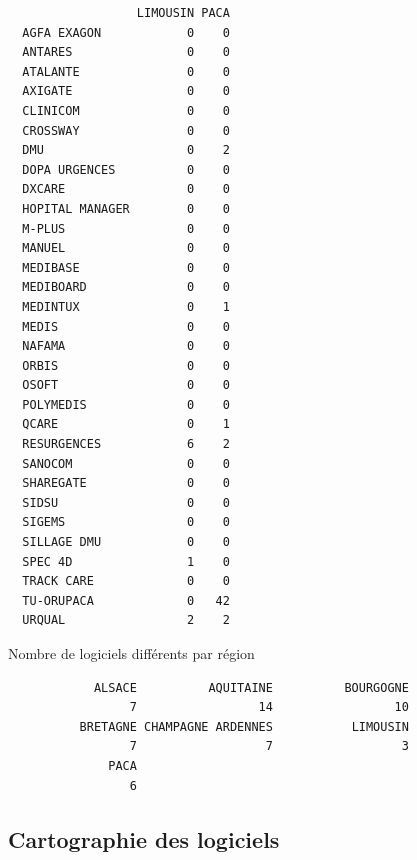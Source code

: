 \documentclass[]{article}
\begin{document}
\begin{verbatim}
                  LIMOUSIN PACA
  AGFA EXAGON            0    0
  ANTARES                0    0
  ATALANTE               0    0
  AXIGATE                0    0
  CLINICOM               0    0
  CROSSWAY               0    0
  DMU                    0    2
  DOPA URGENCES          0    0
  DXCARE                 0    0
  HOPITAL MANAGER        0    0
  M-PLUS                 0    0
  MANUEL                 0    0
  MEDIBASE               0    0
  MEDIBOARD              0    0
  MEDINTUX               0    1
  MEDIS                  0    0
  NAFAMA                 0    0
  ORBIS                  0    0
  OSOFT                  0    0
  POLYMEDIS              0    0
  QCARE                  0    1
  RESURGENCES            6    2
  SANOCOM                0    0
  SHAREGATE              0    0
  SIDSU                  0    0
  SIGEMS                 0    0
  SILLAGE DMU            0    0
  SPEC 4D                1    0
  TRACK CARE             0    0
  TU-ORUPACA             0   42
  URQUAL                 2    2
\end{verbatim}

Nombre de logiciels différents par région

\begin{verbatim}
            ALSACE          AQUITAINE          BOURGOGNE 
                 7                 14                 10 
          BRETAGNE CHAMPAGNE ARDENNES           LIMOUSIN 
                 7                  7                  3 
              PACA 
                 6 
\end{verbatim}

\subsection{Cartographie des
logiciels}\label{cartographie-des-logiciels}
\end{document}

